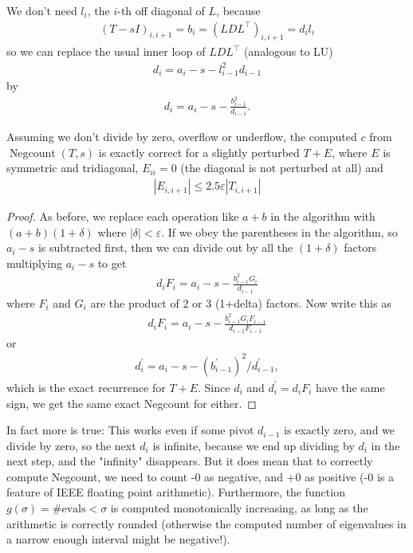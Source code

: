 \documentclass[11pt]{article}
\numberwithin{equation}{section}
\begin{document}
We don't need $l_i$, the $i$-th off diagonal of $L$, because \begin{align*}
    (T-s I)_{i, i+1} = b_i = (LDL^\top)_{i, i+1} = d_i l_i
\end{align*}
so we can replace the usual inner loop of $LDL^\top$ (analogous to LU)
\begin{align*}
    d_i = a_i-s - l_{i-1}^2 d_{i-1}
\end{align*}
by
\begin{align*}
    d_i = a_i-s - \frac{b_{i-1}^2}{d_{i-1}}.
\end{align*}

\begin{theorem}
    Assuming we don't divide by zero, overflow or underflow, the computed $c$ from $\operatorname{Negcount}(T,s)$ is exactly correct for a slightly perturbed $T + E$,
where $E$ is symmetric and tridiagonal,  $E_{ii} = 0$ (the diagonal is not perturbed at all) and \begin{align*}
    |E_{i, i+1}| \leq 2.5 \varepsilon |T_{i, i+1}|
    \end{align*}
    \begin{proof}
        As before, we replace each operation like $a+b$ in the algorithm with $(a+b)(1+\delta)$ where $|\delta| < \varepsilon$. If we obey the parentheses in the algorithm, 
        so $a_i - s$ is subtracted first, then we can divide out by all the $(1+\delta)$ factors multiplying $a_i-s$ to get \begin{align*}
        d_i F_i = a_i-s - \frac{b_{i-1}^2 G_i}{d_{i-1} }
        \end{align*}
        where $F_i$ and $G_i$ are the product of 2 or 3 (1+delta) factors. Now write this as \begin{align*}
            d_i F_i = a_i-s - \frac{b_{i-1}^2 G_i F_{i-1}}{d_{i-1} F_{i-1}}
        \end{align*}
        or \begin{align*}
            d^\prime_{i} = a_i - s - (b^\prime_{i-1})^2 / d^\prime_{i-1},
        \end{align*}
        which is the exact recurrence for $T+E$. Since $d_i$ and $d^\prime_{i} = d_i F_i$ have the same sign, we get the same exact Negcount for either.
    \end{proof}
\end{theorem}

In fact more is true: This works even if some pivot $d_{i-1}$ is exactly zero, and we divide by zero, so the next $d_i$ is infinite, 
because we end up dividing by $d_i$ in the next step, and the "infinity" disappears. But it does mean that to correctly compute Negcount, 
we need to count -0 as negative, and +0 as positive (-0 is a feature of IEEE floating point arithmetic). Furthermore, 
the function $g(\sigma) = \#\mathrm{evals} < \sigma$ is computed monotonically increasing, as long as the arithmetic is correctly rounded 
(otherwise the computed number of eigenvalues in a narrow enough interval might be negative!).
\end{document}
